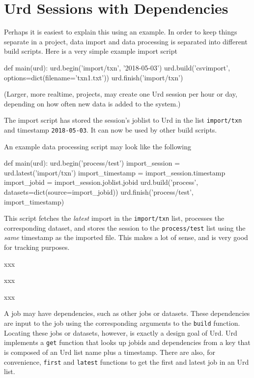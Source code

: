 \section{Urd Sessions with Dependencies}

Perhaps it is easiest to explain this using an example.  In order to
keep things separate in a project, data import and data processing is
separated into different build scripts.  Here is a very simple example
import script
\begin{python}
def main(urd):
    urd.begin('import/txn', '2018-05-03')
    urd.build('csvimport', options=dict(filename='txn1.txt'))
    urd.finish('import/txn')
\end{python}
(Larger, more realtime, projects, may create one Urd session per hour
or day, depending on how often new data is added to the system.)

The import script has stored the session's joblist to Urd in the
list \texttt{import/txn} and timestamp \texttt{2018-05-03}.  It can
now be used by other build scripts.

An example data processing script may look like the following
\begin{python}
def main(urd):
    urd.begin('process/test')
        import_session = urd.latest('import/txn')
        import_timestamp = import_session.timestamp
        import_jobid = import_session.joblist.jobid
        urd.build('process', datasets=dict(source=import_jobid))
    urd.finish('process/test', import_timestamp)
\end{python}
This script fetches the \textsl{latest} import in
the \texttt{import/txn} list, processes the corresponding dataset, and
stores the session to the \texttt{process/test} list using
the \textsl{same} timestamp as the imported file.  This makes a lot of
sense, and is very good for tracking purposes.

xxx

xxx

xxx



A job may have dependencies, such as other jobs or datasets.  These
dependencies are input to the job using the corresponding arguments to
the \texttt{build} function.  Locating these jobs or datasets,
however, is exactly a design goal of Urd.  Urd implements a
\texttt{get} function that looks up jobids and dependencies from a key
that is composed of an Urd list name plus a timestamp.  There are
also, for convenience, \texttt{first} and \texttt{latest} functions to
get the first and latest job in an Urd list.

